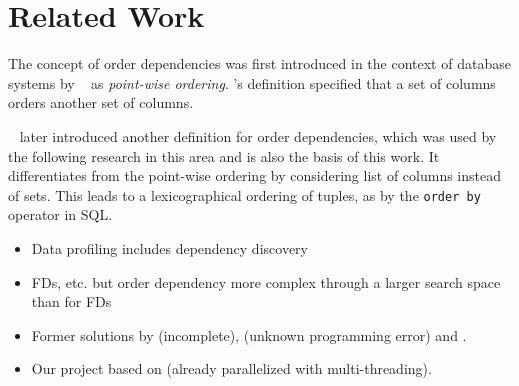 
\section{Related Work}\label{sec:related_work}
  The concept of order dependencies was first introduced in the context of database systems by \citeauthor{ginsburg}~\cite{ginsburg} as \textit{point-wise ordering}.
  \citeauthor{ginsburg}'s definition specified that a set of columns orders another set of columns.

  \citeauthor{szlichta:fundamentals}~\cite{szlichta:fundamentals} later introduced another definition for order dependencies, which was used by the following research in this area \cite{consonni, langer, szlichta:discovery} and is also the basis of this work.
  It differentiates from the point-wise ordering by considering list of columns instead of sets.
  This leads to a lexicographical ordering of tuples, as by the \texttt{order by} operator in SQL.

  \begin{itemize}
    \item Data profiling includes dependency discovery
    \item FDs, etc. but order dependency more complex through a larger search space than for FDs
    \item Former solutions by \cite{langer} (incomplete), \cite{szlichta:discovery} (unknown programming error) and \cite{consonni}.
    \item Our project based on \cite{consonni} (already parallelized with multi-threading).
  \end{itemize}
